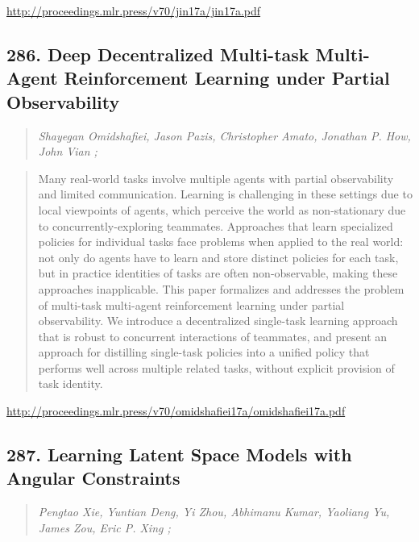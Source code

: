 \documentclass{article}
\begin{document}
\href{http://proceedings.mlr.press/v70/jin17a/jin17a.pdf}{http://proceedings.mlr.press/v70/jin17a/jin17a.pdf}

\subsection{286. Deep Decentralized Multi-task Multi-Agent Reinforcement Learning under Partial Observability}

\begin{quote}
\footnotesize{\textit{Shayegan Omidshafiei, Jason Pazis, Christopher Amato, Jonathan P. How, John Vian ;}}
\end{quote}

\begin{quote}
    Many real-world tasks involve multiple agents with partial observability and limited communication. Learning is challenging in these settings due to local viewpoints of agents, which perceive the world as non-stationary due to concurrently-exploring teammates. Approaches that learn specialized policies for individual tasks face problems when applied to the real world: not only do agents have to learn and store distinct policies for each task, but in practice identities of tasks are often non-observable, making these approaches inapplicable. This paper formalizes and addresses the problem of multi-task multi-agent reinforcement learning under partial observability. We introduce a decentralized single-task learning approach that is robust to concurrent interactions of teammates, and present an approach for distilling single-task policies into a unified policy that performs well across multiple related tasks, without explicit provision of task identity.  \end{quote}

\href{http://proceedings.mlr.press/v70/omidshafiei17a/omidshafiei17a.pdf}{http://proceedings.mlr.press/v70/omidshafiei17a/omidshafiei17a.pdf}

\subsection{287. Learning Latent Space Models with Angular Constraints}

\begin{quote}
\footnotesize{\textit{Pengtao Xie, Yuntian Deng, Yi Zhou, Abhimanu Kumar, Yaoliang Yu, James Zou, Eric P. Xing ;}}
\end{quote}
\end{document}
